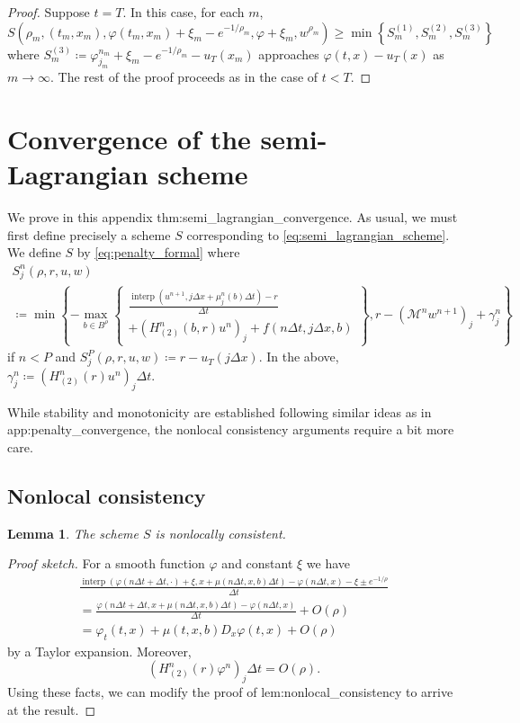 \documentclass[12pt]{article}
\newcounter{dummy}
\newtheorem{lemma}[dummy]{Lemma}
\begin{document}
\begin{proof}
Suppose $t=T$. In this case, for each $m$,
\[
S(\rho_{m},(t_{m},x_{m}),\varphi(t_{m},x_{m})+\xi_{m}-e^{-1/\rho_{m}},\varphi+\xi_{m},w^{\rho_{m}}){\geqslant}\min\left\{ S_{m}^{(1)},S_{m}^{(2)},S_{m}^{(3)}\right\} 
\]
where $S_{m}^{(3)}\coloneqq\varphi_{j_{m}}^{n_{m}}+\xi_{m}-e^{-1/\rho_{m}}-u_{T}(x_{m})$
approaches $\varphi(t,x)-u_{T}(x)$ as $m\rightarrow\infty$. The
rest of the proof proceeds as in the case of $t<T$.
\end{proof}

\section{\label{app:semi_lagrangian_convergence}Convergence of the semi-Lagrangian
scheme}

We prove in this appendix {\prettyref}{thm:semi_lagrangian_convergence}.
As usual, we must first define precisely a scheme $S$ corresponding
to \eqref{eq:semi_lagrangian_scheme}. We define $S$ by \eqref{eq:penalty_formal}
where
\begin{multline*}
S_{j}^{n}(\rho,r,u,w)\\
\coloneqq\min\left\{ -\max_{b\in B^{\rho}}\left\{ \begin{gathered}\frac{{\operatorname{interp}}(u^{n+1},j\Delta x+\mu_j^n(b)\Delta t)-r}{\Delta t}\\
+(H_{(2)}^{n}(b,r)u^{n})_{j}+f(n\Delta t,j\Delta x,b)
\end{gathered}
\right\} ,r-(\mathcal{M}^{n}w^{n+1})_{j}+\gamma_{j}^{n}\right\} 
\end{multline*}
if $n<P$ and $S_{j}^{P}(\rho,r,u,w)\coloneqq r-u_{T}(j\Delta x)$.
In the above, $\gamma_{j}^{n}\coloneqq(H_{(2)}^{n}(r)u^{n})_{j}\Delta t$.

While stability and monotonicity are established following similar
ideas as in {\prettyref}{app:penalty_convergence}, the nonlocal consistency
arguments require a bit more care.

\subsection{Nonlocal consistency}
\begin{lemma}
The scheme $S$ is nonlocally consistent.
\end{lemma}
\begin{proof}[Proof sketch]
For a smooth function $\varphi$ and constant $\xi$ we have
\begin{multline*}
\frac{{\operatorname{interp}}(\varphi(n\Delta t+\Delta t,\cdot)+\xi,x+\mu(n\Delta t,x,b)\Delta t)-\varphi(n\Delta t,x)-\xi\pm e^{-1/\rho}}{\Delta t}\\
=\frac{\varphi(n\Delta t+\Delta t,x+\mu(n\Delta t,x,b)\Delta t)-\varphi(n\Delta t,x)}{\Delta t}+O(\rho)\\
=\varphi_{t}(t,x)+\mu(t,x,b)D_{x}\varphi(t,x)+O(\rho)
\end{multline*}
by a Taylor expansion. Moreover,
\[
(H_{(2)}^{n}(r)\varphi^{n})_{j}\Delta t=O(\rho).
\]
Using these facts, we can modify the proof of {\prettyref}{lem:nonlocal_consistency}
to arrive at the result.
\end{proof}
\end{document}
